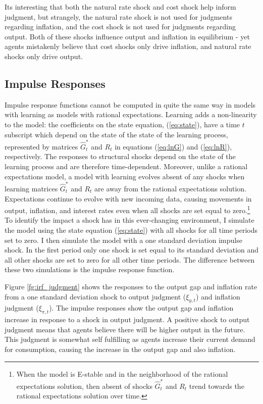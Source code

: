 \documentclass[10pt]{article}
\begin{document}
{Its interesting that both the natural rate shock and cost shock help inform judgment, but strangely, the natural rate shock is not used for judgments regarding inflation, and the cost shock is not used for judgments regarding output.  Both of these shocks influence output and inflation in equilibrium - yet agents mistakenly believe that cost shocks only drive inflation, and natural rate shocks only drive output.

\subsection{Impulse Responses}
Impulse response functions cannot be computed in quite the same way in models with learning as models with rational expectations.  Learning adds a non-linearity to the model: the coefficients on the state equation, (\ref{eq:state}), have a time $t$ subscript which depend on the state of the state of the learning process, represented by matrices $\hat{G}_t^*$ and $R_t$ in equations (\ref{eq:lnG}) and (\ref{eq:lnR}), respectively.  The responses to structural shocks depend on the state of the learning process and are therefore time-dependent.  Moreover, unlike a rational expectations model, a model with learning evolves absent of any shocks when learning matrices $\hat{G}_t^*$ and $R_t$ are away from the rational expectations solution.  Expectations continue to evolve with new incoming data, causing movements in output, inflation, and interest rates even when all shocks are set equal to zero.\footnote{When the model is E-stable and in the neighborhood of the rational expectations solution, then absent of shocks $\hat{G}_t^*$ and $R_t$ trend towards the rational expectations solution over time.}  To identify the impact a shock has in this ever-changing environment, I simulate the model using the state equation (\ref{eq:state}) with all shocks for all time periods set to zero.  I then simulate the model with a one standard deviation impulse shock.  In the first period only one shock is set equal to its standard deviation and all other shocks are set to zero for all other time periods.  The difference between these two simulations is the impulse response function. 

Figure \ref{fg:irf_judgment} shows the responses to the output gap and inflation rate from a one standard deviation shock to output judgment ($\xi_{y,t}$) and inflation judgment ($\xi_{\pi,t}$).  The impulse responses show the output gap and inflation increase in response to a shock in output judgment.  A positive shock to output judgment means that agents believe there will be higher output in the future.  This judgment is somewhat self fulfilling as agents increase their current demand for consumption, causing the increase in the output gap and also inflation.  

}
\end{document}
